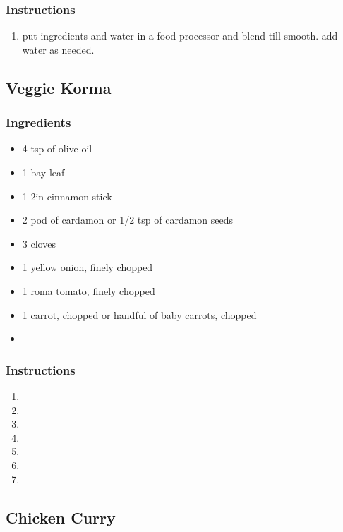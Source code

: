 \documentclass[11pt]{article}
\begin{document}
\subsubsection*{Instructions}
\label{sec:org72553e4}
\begin{enumerate}
\item put ingredients and water in a food processor and blend till smooth. add water as needed.
\end{enumerate}
\subsection{Veggie Korma}
\label{sec:org6cc7e81}
\subsubsection*{Ingredients}
\label{sec:org5cc9b36}
\begin{itemize}
\item 4 tsp of olive oil
\item 1 bay leaf
\item 1 2in cinnamon stick
\item 2 pod of cardamon or 1/2 tsp of cardamon seeds
\item 3 cloves
\item 1 yellow onion, finely chopped
\item 1 roma tomato, finely chopped
\item 1 carrot, chopped or handful of baby carrots, chopped
\item 
\end{itemize}
\subsubsection*{Instructions}
\label{sec:org3d2bd96}
\begin{enumerate}
\item 

\item 

\item 

\item 

\item 

\item 

\item 
\end{enumerate}
\subsection{Chicken Curry}
\label{sec:orge910735}
\end{document}
